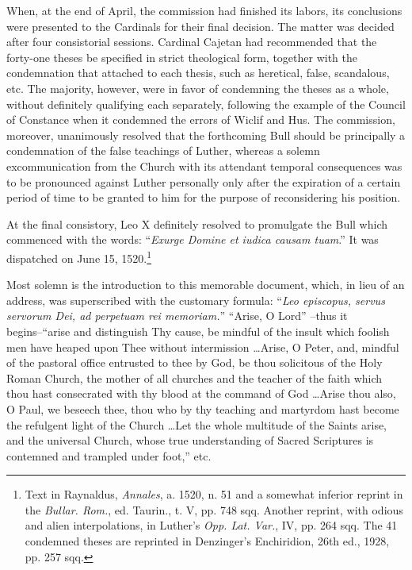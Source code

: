 When, at the end of April, the commission had finished its labors,
its conclusions were presented to the Cardinals for their final decision.
The matter was decided after four consistorial sessions. Cardinal Cajetan
had recommended that the forty-one theses be specified
in strict theological form, together with the condemnation that attached
to each thesis, such as heretical, false, scandalous, etc. The majority,
however, were in favor of condemning the theses as a whole,
without definitely qualifying each separately, following the example
of the Council of Constance when it condemned the errors of Wiclif
and Hus. The commission, moreover, unanimously resolved that the
forthcoming Bull should be principally a condemnation of the false
teachings of Luther, whereas a solemn excommunication from the
Church with its attendant temporal consequences was to be pronounced against
Luther personally only after the expiration of a
certain period of time to be granted to him for the purpose of reconsidering
his position.

At the final consistory, Leo X definitely resolved to promulgate the
Bull which commenced with the words: “\textit{Exurge Domine et iudica
causam tuam}.” It was dispatched on June 15, 1520.\footnote
{Text in Raynaldus, \textit{Annales}, a. 1520, n. 51 and a somewhat inferior reprint in the
\textit{Bullar. Rom.}, ed. Taurin., t. V, pp. 748 sqq. Another reprint, with odious and alien interpolations,
in Luther’s \textit{Opp. Lat. Var.}, IV, pp. 264 sqq. The 41 condemned theses are
reprinted in Denzinger’s Enchiridion, 26th ed., 1928, pp. 257 sqq.}


Most solemn is the introduction to this memorable document, which, in
lieu of an address, was superscribed with the customary formula: ``\textit{Leo episcopus,
servus servorum Dei, ad perpetuam rei memoriam.}” “Arise, O Lord”
--thus it begins--``arise and distinguish Thy cause, be mindful of the insult
which foolish men have heaped upon Thee without intermission \dots Arise,
O Peter, and, mindful of the pastoral office entrusted to thee by God,
be thou solicitous of the Holy Roman Church, the mother of all churches
and the teacher of the faith which thou hast consecrated with thy blood
at the command of God \dots Arise thou also, O Paul, we beseech thee,
thou who by thy teaching and martyrdom hast become the refulgent light
of the Church \dots Let the whole multitude of the Saints arise, and the
universal Church, whose true understanding of Sacred Scriptures is
contemned and trampled under foot,” etc.

